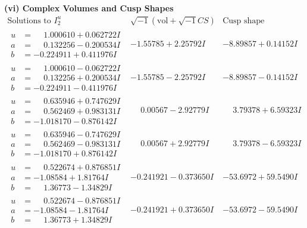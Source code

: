 \documentclass[1p]{elsarticle_modified}
\theoremstyle{definition}
\newcommand{\I}{\sqrt{-1}}
\begin{document}
\newpage\flushleft \textbf{(vi) Complex Volumes and Cusp Shapes}
$$\begin{array}{c|c|c}  
\text{Solutions to }I^u_{2}& \I (\text{vol} + \sqrt{-1}CS) & \text{Cusp shape}\\
 \hline 
\begin{aligned}
u &= \phantom{-}1.000610 + 0.062722 I \\
a &= \phantom{-}0.132256 - 0.200534 I \\
b &= -0.224911 + 0.411976 I\end{aligned}
 & -1.55785 + 2.25792 I & -8.89857 + 0.14152 I \\ \hline\begin{aligned}
u &= \phantom{-}1.000610 - 0.062722 I \\
a &= \phantom{-}0.132256 + 0.200534 I \\
b &= -0.224911 - 0.411976 I\end{aligned}
 & -1.55785 - 2.25792 I & -8.89857 - 0.14152 I \\ \hline\begin{aligned}
u &= \phantom{-}0.635946 + 0.747629 I \\
a &= \phantom{-}0.562469 + 0.983131 I \\
b &= -1.018170 - 0.876142 I\end{aligned}
 & \phantom{-}0.00567 - 2.92779 I & \phantom{-}3.79378 + 6.59323 I \\ \hline\begin{aligned}
u &= \phantom{-}0.635946 - 0.747629 I \\
a &= \phantom{-}0.562469 - 0.983131 I \\
b &= -1.018170 + 0.876142 I\end{aligned}
 & \phantom{-}0.00567 + 2.92779 I & \phantom{-}3.79378 - 6.59323 I \\ \hline\begin{aligned}
u &= \phantom{-}0.522674 + 0.876851 I \\
a &= -1.08584 + 1.81764 I \\
b &= \phantom{-}1.36773 - 1.34829 I\end{aligned}
 & -0.241921 - 0.373650 I & -53.6972 + 59.5490 I \\ \hline\begin{aligned}
u &= \phantom{-}0.522674 - 0.876851 I \\
a &= -1.08584 - 1.81764 I \\
b &= \phantom{-}1.36773 + 1.34829 I\end{aligned}
 & -0.241921 + 0.373650 I & -53.6972 - 59.5490 I \\ \hline\begin{aligned}

\end{aligned}
\end{array}$$
\end{document}
